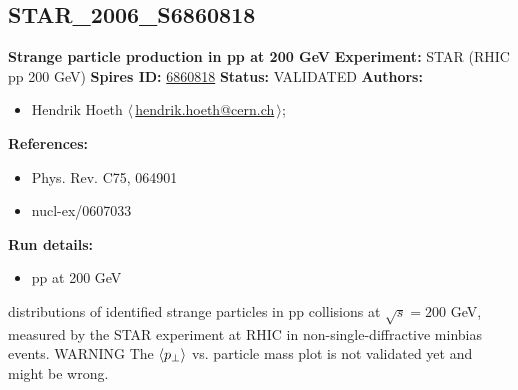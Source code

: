 \subsection[STAR\_2006\_S6860818]{STAR\_2006\_S6860818\,\cite{Abelev:2006cs}}
\textbf{Strange particle production in pp at 200 GeV}\newline
\textbf{Experiment:} STAR (RHIC pp 200 GeV) \newline
\textbf{Spires ID:} \href{http://www.slac.stanford.edu/spires/find/hep/www?rawcmd=key+6860818}{6860818}\newline
\textbf{Status:} VALIDATED\newline
\textbf{Authors:}
\begin{itemize}
  \item Hendrik Hoeth $\langle\,$\href{mailto:hendrik.hoeth@cern.ch}{hendrik.hoeth@cern.ch}$\,\rangle$;
\end{itemize}
\textbf{References:}
\begin{itemize}
  \item Phys. Rev. C75, 064901
  \item nucl-ex/0607033
\end{itemize}
\textbf{Run details:}
\begin{itemize}

  \item pp at 200 GeV\end{itemize}

\noindent \pT distributions of identified strange particles in pp collisions  at $\sqrt{s} = 200$ GeV, measured by the STAR experiment at RHIC in non-single-diffractive minbias events. WARNING The $\langle p_\perp \rangle$ vs. particle mass plot is not validated yet and might be wrong.

\clearpage


\clearpage

